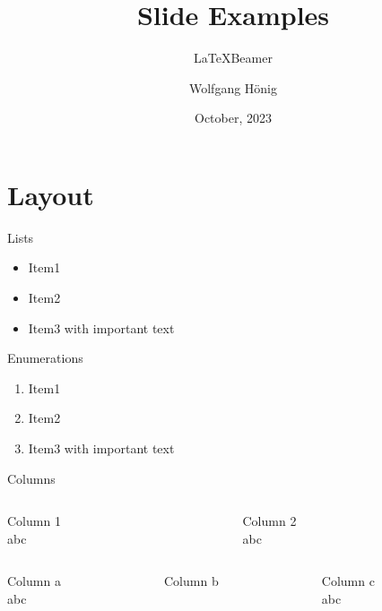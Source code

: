 \documentclass[aspectratio=169,xcolor={svgnames}]{beamer}
\title{Slide Examples}
\subtitle{\LaTeX Beamer}
\author{Wolfgang Hönig}
\date{October, 2023}
\begin{document}

  \section{Layout}

  \begin{frame}{Lists}

    \begin{itemize}
      \item Item1
      \item Item2
      \item Item3 with \alert{important} text
    \end{itemize}

  \end{frame}

  \begin{frame}{Enumerations}

    \begin{enumerate}
      \item Item1
      \item Item2
      \item Item3 with \alert{important} text
    \end{enumerate}

  \end{frame}

  \begin{frame}{Columns}

    \begin{columns}
      \begin{column}{0.5\textwidth}
        Column 1\\
        abc
      \end{column}
      \begin{column}{0.5\textwidth}
        Column 2\\
        abc
      \end{column}
    \end{columns}

    \vfill

    \begin{columns}
      \begin{column}{0.33\textwidth}
        Column a\\
        abc
      \end{column}
      \begin{column}{0.33\textwidth}
        Column b
      \end{column}
      \begin{column}{0.33\textwidth}
        Column c\\
        abc
      \end{column}
    \end{columns}

  \end{frame}
\end{document}
